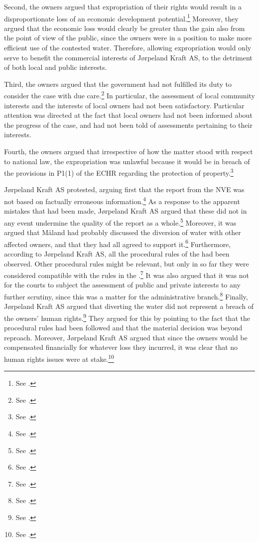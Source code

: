Second, the owners argued that expropriation of their rights would result in a disproportionate loss of an economic development potential.\footnote{See \cite[5]{jorpeland11a}.} Moreover, they argued that the economic loss would clearly be greater than the gain also from the point of view of the public, since the owners were in a position to make more efficient use of the contested water. Therefore, allowing expropriation would only serve to benefit the commercial interests of Jørpeland Kraft AS, to the detriment of both local and public interests.

Third, the owners argued that the government had not fulfilled its duty to consider the case with due care.\footnote{See \cite[12]{jorpeland09}.} In particular, the assessment of local community interests and the interests of local owners had not been satisfactory. Particular attention was directed at the fact that local owners had not been informed about the progress of the case, and had not been told of assessments pertaining to their interests.

Fourth, the owners argued that irrespective of how the matter stood with respect to national law, the expropriation was unlawful because it would be in breach of the provisions in P1(1) of the ECHR regarding the protection of property.\footnote{See \cite[07-08]{jorpeland09}.}

Jørpeland Kraft AS protested, arguing first that the report from the NVE was not based on factually erroneous information.\footnote{See \cite[16]{jorpeland11}.} As a response to the apparent mistakes that had been made, Jørpeland Kraft AS argued that these did not in any event undermine the quality of the report as a whole.\footnote{See \cite[2]{jorpeland11a)}.} Moreover, it was argued that Måland had probably discussed the diversion of water with other affected owners, and that they had all agreed to support it.\footnote{See \cite[2]{jorpeland11a}.} Furthermore, according to Jørpeland Kraft AS, all the procedural rules of the \cite{wra17} had been observed. Other procedural rules might be relevant, but only in so far they were considered compatible with the rules in the \cite{wra17}.\footnote{See \cite[16]{jorpeland11}.} It was also argued that it was not for the courts to subject the assessment of public and private interests to any further scrutiny, since this was a matter for the administrative branch.\footnote{See \cite[2]{jorpeland11a}.} Finally, Jørpeland Kraft AS argued that diverting the water did not represent a breach of the owners' human rights.\footnote{See \cite[2]{jorpeland11a}.} They argued for this by pointing to the fact that the procedural rules had been followed and that the material decision was beyond reproach. Moreover, Jørpeland Kraft AS argued that since the owners would be compensated financially for whatever loss they incurred, it was clear that no human rights issues were at stake.\footnote{See \cite[2]{jorpeland11a}.}


